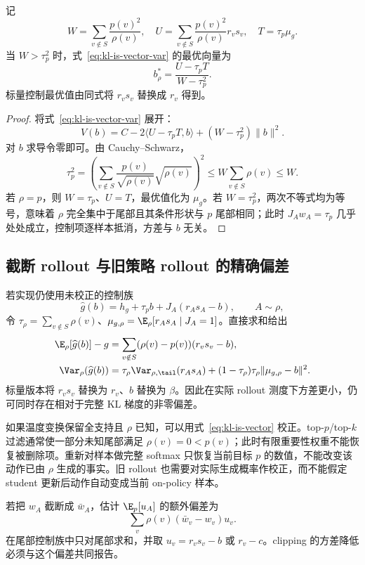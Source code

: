 \begin{proposition}
记
\[
 W=\sum_{v\notin S}\frac{p(v)^2}{\rho(v)},\quad
 U=\sum_{v\notin S}\frac{p(v)^2}{\rho(v)}r_vs_v,\quad
 T=\tau_p\mu_g.
\]
当 $W>\tau_p^2$ 时，式~\eqref{eq:kl-is-vector-var} 的最优向量为
\[
 b_\rho^*=\frac{U-\tau_pT}{W-\tau_p^2}.
\]
标量控制最优值由同式将 $r_vs_v$ 替换成 $r_v$ 得到。
\end{proposition}

\begin{proof}
将式~\eqref{eq:kl-is-vector-var} 展开：
\[
 V(b)=C-2\langle U-\tau_pT,b\rangle
          +(W-\tau_p^2)\lVert b\rVert^2.
\]
对 $b$ 求导令零即可。由 Cauchy--Schwarz，
\[
 \tau_p^2
 =\left(\sum_{v\notin S}\frac{p(v)}{\sqrt{\rho(v)}}\sqrt{\rho(v)}\right)^2
 \leq W\sum_{v\notin S}\rho(v)\leq W.
\]
若 $\rho=p$，则 $W=\tau_p$、$U=T$，最优值化为 $\mu_g$。若 $W=\tau_p^2$，两次不等式均为等号，意味着 $\rho$ 完全集中于尾部且其条件形状与 $p$ 尾部相同；此时 $J_Aw_A=\tau_p$ 几乎处处成立，控制项逐样本抵消，方差与 $b$ 无关。
\end{proof}

\subsection{截断 rollout 与旧策略 rollout 的精确偏差}

若实现仍使用未校正的控制族
\[
 \widehat g(b)=h_g+\tau_pb+J_A(r_As_A-b),\qquad A\sim\rho,
\]
令 $\tau_\rho=\sum_{v\notin S}\rho(v)$、$\mu_{g,\rho}=\E_\rho[r_As_A\mid J_A=1]$。直接求和给出
\begin{align}
 \E_\rho[\widehat g(b)]-g
 &=\sum_{v\notin S}(\rho(v)-p(v))(r_vs_v-b), \label{eq:kl-wrong-measure-bias}\\
 \Var_\rho(\widehat g(b))
 &=\tau_\rho\Var_{\rho,\tail}(r_As_A)
  +(1-\tau_\rho)\tau_\rho\lVert\mu_{g,\rho}-b\rVert^2. \label{eq:kl-wrong-measure-var}
\end{align}
标量版本将 $r_vs_v$ 替换为 $r_v$、$b$ 替换为 $\beta$。因此在实际 rollout 测度下方差更小，仍可同时存在相对于完整 KL 梯度的非零偏差。

如果温度变换保留全支持且 $\rho$ 已知，可以用式~\eqref{eq:kl-is-vector} 校正。top-$p$/top-$k$ 过滤通常使一部分未知尾部满足 $\rho(v)=0<p(v)$；此时有限重要性权重不能恢复被删除项。重新对样本做完整 softmax 只恢复当前目标 $p$ 的数值，不能改变该动作已由 $\rho$ 生成的事实。旧 rollout 也需要对实际生成概率作校正，而不能假定 student 更新后动作自动变成当前 on-policy 样本。

若把 $w_A$ 截断成 $\bar w_A$，估计 $\E_p[u_A]$ 的额外偏差为
\[
 \sum_v\rho(v)(\bar w_v-w_v)u_v.
\]
在尾部控制族中只对尾部求和，并取 $u_v=r_vs_v-b$ 或 $r_v-c$。clipping 的方差降低必须与这个偏差共同报告。

